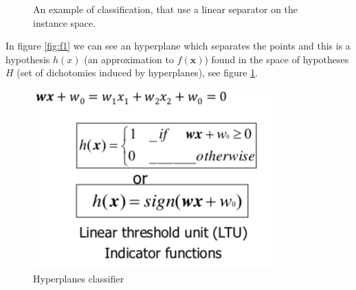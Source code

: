 \documentclass[../main.tex]{subfiles}
\begin{document}
\begin{figure}[h]
  \centering
  \hfill
  \caption{An example of classification, that use a linear separator on the instance space.}
\end{figure}
In figure \ref{fig:f1} we can see an hyperplane which separates the points and this is a hypothesis $h(x)$ (an approximation to $f(\mathbf{x})$) found in the space of hypotheses $H$ (set of dichotomies induced by hyperplanes), see figure \ref{fig:intro_classification_exp2}.
\begin{figure}[H]
    \centering
    \includegraphics[scale = 0.4]{lectures/1_Introduction/intro_classification_3.png}
    \caption{Hyperplanes classifier}
    \label{fig:intro_classification_exp2}
\end{figure}
\end{document}
